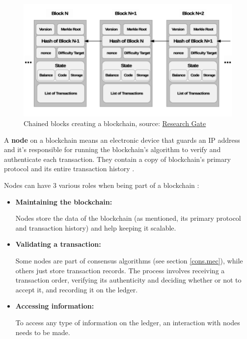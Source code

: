 \begin{figure}[htbp]
	\centering
	\includegraphics[scale=0.5]{figures/blockchain.png}  %
	\caption{Chained blocks creating a blockchain, source: \href{https://www.researchgate.net/figure/Blockchain-design-structure-showing-chained-blocks-with-header-and-body-fields_fig2_321017113}{Research Gate}}
	\label{fig:blocks}
\end{figure}

A \textbf{node} on a blockchain means an electronic device that guards an IP address and it's responsible for running the blockchain's algorithm to verify and authenticate each transaction. They contain a copy of blockchain's primary protocol and its entire transaction history \cite{node}.\newline

Nodes can have 3 various roles when being part of a blockchain \cite{node_type}:

\begin{itemize}
    \item \textbf{Maintaining the blockchain:}
    
Nodes store the data of the blockchain (as mentioned, its primary protocol and transaction history) and help keeping it scalable. 
    
    \item \textbf{Validating a transaction:}

    Some nodes are part of consensus algorithms (see section \ref{cons.mec}), while others just store transaction records. The process involves receiving a transaction order, verifying its authenticity and deciding whether or not to accept it, and recording it on the ledger.
    
    \item \textbf{Accessing information:}

    To access any type of information on the ledger, an interaction with nodes needs to be made. 
\end{itemize}

